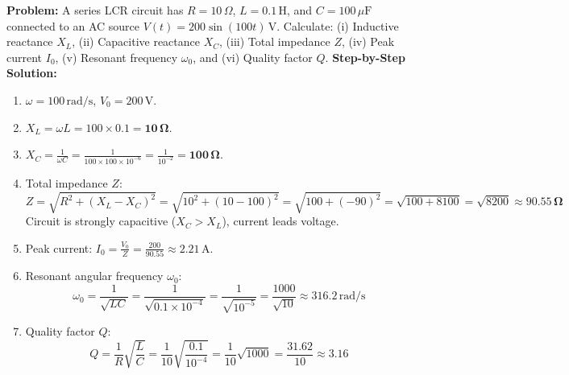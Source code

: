 \documentclass[10pt,a4paper]{article}
\begin{document}
\begin{usecasebox}
\textbf{Problem:} A series LCR circuit has $R = 10\,\Omega$, $L = 0.1\,\mathrm{H}$, and $C = 100\,\mu\mathrm{F}$ connected to an AC source $V(t) = 200 \sin(100 t)\,\mathrm{V}$. Calculate: (i) Inductive reactance $X_L$, (ii) Capacitive reactance $X_C$, (iii) Total impedance $Z$, (iv) Peak current $I_0$, (v) Resonant frequency $\omega_0$, and (vi) Quality factor $Q$.
\textbf{Step-by-Step Solution:}
\begin{enumerate}
  \item $\omega = 100\,\mathrm{rad/s}$, $V_0 = 200\,\mathrm{V}$.
  \item $X_L = \omega L = 100 \times 0.1 = \mathbf{10\,\Omega}$.
  \item $X_C = \frac{1}{\omega C} = \frac{1}{100 \times 100 \times 10^{-6}} = \frac{1}{10^{-2}} = \mathbf{100\,\Omega}$.
  \item Total impedance $Z$:
  \begin{equation}
    Z = \sqrt{R^2 + (X_L - X_C)^2} = \sqrt{10^2 + (10 - 100)^2} = \sqrt{100 + (-90)^2} = \sqrt{100 + 8100} = \sqrt{8200} \approx \mathbf{90.55\,\Omega}
  \end{equation}
  Circuit is strongly capacitive ($X_C > X_L$), current leads voltage.
  \item Peak current: $I_0 = \frac{V_0}{Z} = \frac{200}{90.55} \approx \mathbf{2.21\,\mathrm{A}}$.
  \item Resonant angular frequency $\omega_0$:
  \begin{equation}
    \omega_0 = \frac{1}{\sqrt{LC}} = \frac{1}{\sqrt{0.1 \times 10^{-4}}} = \frac{1}{\sqrt{10^{-5}}} = \frac{1000}{\sqrt{10}} \approx \mathbf{316.2\,\mathrm{rad/s}}
  \end{equation}
  \item Quality factor $Q$:
  \begin{equation}
    Q = \frac{1}{R}\sqrt{\frac{L}{C}} = \frac{1}{10}\sqrt{\frac{0.1}{10^{-4}}} = \frac{1}{10}\sqrt{1000} = \frac{31.62}{10} \approx \mathbf{3.16}
  \end{equation}
\end{enumerate}
\end{usecasebox}
\end{document}
